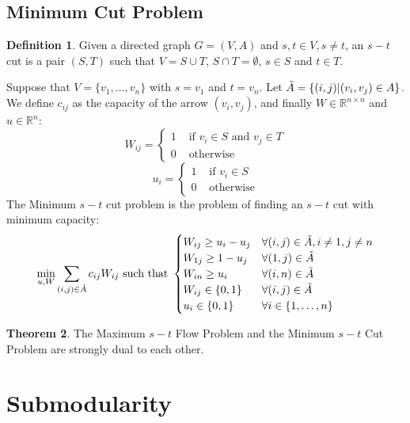 \documentclass[12pt, openany]{report}
\newcommand{\R}{\mathbb{R}}
\theoremstyle{definition}
\newtheorem{thm}{Theorem}[chapter]
\newtheorem{definition}[thm]{Definition}
\begin{document}
\section{Minimum Cut Problem}
\begin{definition}
    Given a directed graph $G=(V,A)$ and $s,t\in V,s\neq t$, an $s-t$ cut is a pair $(S,T)$ such that $V=S\cup T$, $S\cap T=\emptyset$, $s\in S$ and $t\in T$.
\end{definition}
Suppose that $V=\{v_1,\dots,v_n\}$ with $s=v_1$ and $t=v_n$. Let $\Tilde A=\{(i,j)|(v_i,v_j)\in A\}$. We define $c_{ij}$ as the capacity of the arrow $(v_i,v_j)$, and finally $W\in \R^{n\times n}$ and $u\in \R^n$:
\begin{equation}
    W_{ij} = \begin{cases}
        1& \text{ if } v_i \in S\text{ and } v_j\in T\\
        0& \text{ otherwise}    
    \end{cases}
\end{equation}
\begin{equation}
    u_i = \begin{cases}
        1& \text{ if } v_i \in S\\
        0& \text{ otherwise}    
    \end{cases}
\end{equation}
The Minimum $s-t$ cut problem is the problem of finding an $s-t$ cut with minimum capacity:
\begin{equation}
    \min_{u,W} \sum_{(i,j)\in \Tilde A}c_{ij}W_{ij}\text{ such that } \begin{cases}
        W_{ij}\ge u_i-u_j & \forall (i,j)\in \Tilde A, i\neq 1, j \neq n\\
        W_{1j}\ge 1-u_j & \forall (1,j)\in \Tilde A\\
        W_{in}\ge u_i & \forall (i,n)\in \Tilde A\\
        W_{ij}\in \{0,1\}& \forall (i,j)\in \Tilde A\\
        u_i \in \{0,1\} & \forall i\in \{1,\dots,n\}\\
    \end{cases}
\end{equation}
\begin{thm}
    The Maximum $s-t$ Flow Problem and the Minimum $s-t$ Cut Problem are strongly dual to each other.
\end{thm}
\chapter{Submodularity}
\end{document}
